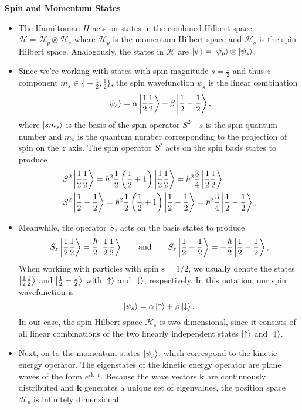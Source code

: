\documentclass[11pt, a4paper]{article}
\newcommand{\eqtext}[1]{\qquad \text{#1} \qquad}
\renewcommand{\vec}[1]{\bm{#1}} %
\renewcommand{\H}{\mathcal{H}}  %
\newcommand{\ua}{\uparrow}  %
\newcommand{\da}{\downarrow}  %
\begin{document}
\vspace{2mm}
\textbf{Spin and Momentum States}
\begin{itemize}
	\item The Hamiltonian $ H $ acts on states in the combined Hilbert space 
	$ \H = \H_{p}\otimes \H_{s} $ where $ \H_{p} $ is the momentum Hilbert space and $ \H_{s} $ is the spin Hilbert space. Analogously, the states in $ \H $ are $ \ket{\psi} = \ket{\psi_{p}} \otimes \ket{\psi_{s}}$. 
	
	\item Since we're working with states with spin magnitude $ s = \frac{1}{2} $ and thus $ z $ component $ m_{s} \in  \big\{-\tfrac{1}{2}, \tfrac{1}{2}\big\} $, the spin wavefunction $ \psi_{s} $ is the linear combination
	\begin{equation*}
		\ket{\psi_{s}} = \alpha \ket{\frac{1}{2}\frac{1}{2}} + \beta \ket{\frac{1}{2}-\frac{1}{2}},
	\end{equation*}
	where $ \ket{sm_{s}} $ is the basis of the spin operator $ S^{2} $---$ s $ is the spin quantum number and $ m_{s} $ is the quantum number corresponding to the projection of spin on the $ z $ axis. The spin operator $ S^{2} $ acts on the spin basis states to produce
	\begin{align*}
		&S^{2} \ket{\frac{1}{2}\frac{1}{2}} = \hbar^{2} \frac{1}{2}\left(\frac{1}{2} + 1\right ) \ket{\frac{1}{2}\frac{1}{2}} = \hbar^{2} \frac{3}{4} \ket{\frac{1}{2}\frac{1}{2}}\\
		& S^{2} \ket{\frac{1}{2}-\frac{1}{2}} = \hbar^{2} \frac{1}{2}\left (\frac{1}{2} + 1\right ) \ket{\frac{1}{2}-\frac{1}{2}} = \hbar^{2} \frac{3}{4} \ket{\frac{1}{2}-\frac{1}{2}}.
	\end{align*}
	
	\item Meanwhile, the operator $ S_{z} $ acts on the basis states to produce
	\begin{equation*}
		S_{z} \ket{\frac{1}{2}\frac{1}{2}} = \frac{\hbar}{2} \ket{\frac{1}{2}\frac{1}{2}} \eqtext{and} S_{z} \ket{\frac{1}{2}-\frac{1}{2}} = -\frac{\hbar}{2} \ket{\frac{1}{2}-\frac{1}{2}},
	\end{equation*}
	When working with particles with spin $ s = 1/2 $, we usually denote the states $  \ket{\frac{1}{2}\frac{1}{2}}  $ and $  \ket{\frac{1}{2}-\frac{1}{2}}  $ with $ \ket{\ua} $ and $ \ket{\da} $, respectively. In this notation, our spin wavefunction is
	\begin{equation*}
		\ket{\psi_{s}} = \alpha \ket{\ua} + \beta \ket{\da}.
	\end{equation*}
	In our case, the spin Hilbert space $ \H_{s} $ is two-dimensional, since it consists of all linear combinations of the two linearly independent states $ \ket{\ua} $ and $ \ket{\da} $. 
	
	\item Next, on to the momentum states $ \ket{\psi_{p}} $, which correspond to the kinetic energy operator. The eigenstates of the kinetic energy operator are plane waves of the form $ e^{i\vec{k}\cdot \vec{r}} $. Because the wave vectors $ \vec{k} $ are continuously distributed and $ \vec{k} $ generates a unique set of eigenvalues, the position space $ \H_{p} $ is infinitely dimensional.
\end{itemize}
\end{document}
